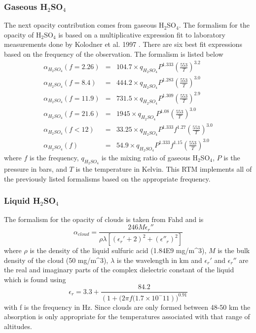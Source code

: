 \subsubsection{Gaseous H$_2$SO$_4$}
The next opacity contribution comes from gaseous H$_2$SO$_4$. The formalism for the opacity of H$_2$SO$_4$ is based on a multiplicative expression fit to laboratory measurements done by Kolodner et al. 1997 \cite{Kolodner-thesis}. There are six best fit expressions based on the frequency of the observation. The formalism is listed below
\begin{eqnarray}
\alpha_{H_2SO_4}(f = 2.26) &=& 104.7 \times q_{H_2SO_4}P^{1.333}\left(\frac{553}{T}\right)^{3.2} \\
\alpha_{H_2SO_4}(f = 8.4)  &=& 444.2 \times q_{H_2SO_4}P^{1.283}\left(\frac{553}{T}\right)^{3.0} \\
\alpha_{H_2SO_4}(f = 11.9) &=& 731.5 \times q_{H_2SO_4}P^{1.309}\left(\frac{553}{T}\right)^{2.9} \\
\alpha_{H_2SO_4}(f = 21.6) &=& 1945 \times q_{H_2SO_4}P^{1.08}\left(\frac{553}{T}\right)^{3.0} \\
\alpha_{H_2SO_4}(f < 12)   &=& 33.25 \times q_{H_2SO_4}P^{1.333}f^{1.27}\left(\frac{553}{T}\right)^{3.0} \\
\alpha_{H_2SO_4}(f)        &=& 54.9 \times q_{H_2SO_4}P^{1.333}f^{1.15}\left(\frac{553}{T}\right)^{3.0} 
\end{eqnarray}
where $f$ is the frequency, $q_{H_2SO_4}$ is the mixing ratio of gaseous H$_2$SO$_4$, $P$ is the pressure in bars, and $T$ is the temperature in Kelvin. This RTM implements all of the previously listed formalisms based on the appropriate frequency.

\subsubsection{Liquid H$_2$SO$_4$}
The formalism for the opacity of clouds is taken from Fahd \cite{Fahd-thesis} and is
\begin{equation}
\alpha_{cloud} = \frac{246 M \epsilon_r''}{\rho \lambda \left[ (\epsilon_r' +2)^2 + (\epsilon''_r)^2\right]}
\end{equation}
where $\rho$ is the density of the liquid sulfuric acid (1.84E9 mg/m\^{}3), $M$ is the bulk density of the cloud (50 mg/m\^{}3), $\lambda$ is the wavelength in km and $\epsilon_r'$ and $\epsilon_r''$ are the real and imaginary parts of the complex dielectric constant of the liquid which is found using
\begin{equation}
\epsilon_r = 3.3+\frac{84.2}{\left(1+(2\pi f (1.7\times 10^-11\right))^{0.91}}
\end{equation} 
with f is the frequency in Hz. 
Since clouds are only formed between 48-50 km the absorption is only appropriate for the temperatures associated with that range of altitudes. 

